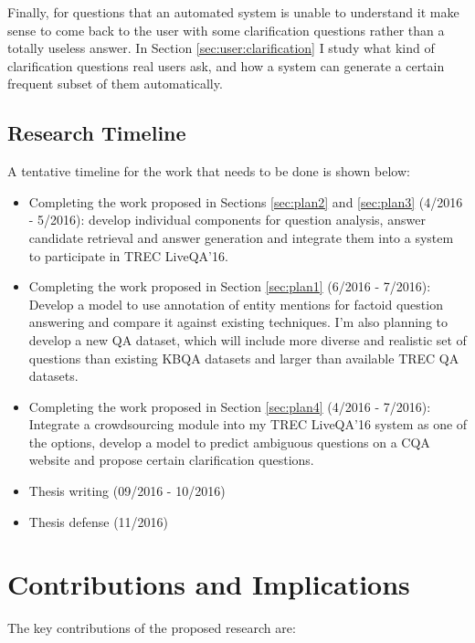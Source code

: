 Finally, for questions that an automated system is unable to understand it make sense to come back to the user with some clarification questions rather than a totally useless answer.
In Section \ref{sec:user:clarification} I study what kind of clarification questions real users ask, and how a system can generate a certain frequent subset of them automatically.


\subsection{Research Timeline}

\noindent
A tentative timeline for the work that needs to be done is shown below:


\begin{itemize}
\item Completing the work proposed in Sections \ref{sec:plan2} and \ref{sec:plan3} (4/2016 - 5/2016): develop individual components for question analysis, answer candidate retrieval and answer generation and integrate them into a system to participate in TREC LiveQA'16.
\item Completing the work proposed in Section \ref{sec:plan1} (6/2016 - 7/2016): Develop a model to use annotation of entity mentions for factoid question answering and compare it against existing techniques. I'm also planning to develop a new QA dataset, which will include more diverse and realistic set of questions than existing KBQA datasets and larger than available TREC QA datasets.
\item Completing the work proposed in Section \ref{sec:plan4} (4/2016 - 7/2016): Integrate a crowdsourcing module into my TREC LiveQA'16 system as one of the options, develop a model to predict ambiguous questions on a CQA website and propose certain clarification questions.
\item Thesis writing (09/2016 - 10/2016) 
\item Thesis defense (11/2016)
\end{itemize}


\section{Contributions and Implications}

The key contributions of the proposed research are:


